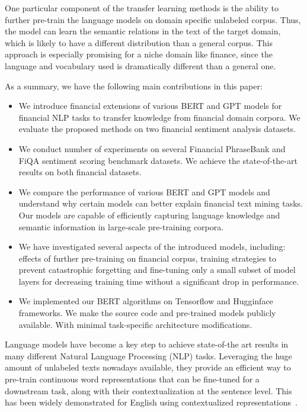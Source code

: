 \documentclass[11pt]{article}
\begin{document}
One particular component of the transfer learning methods is the
ability to further pre-train the language models on domain specific
unlabeled corpus. Thus, the model can learn the semantic relations
in the text of the target domain, which is likely to have a different
distribution than a general corpus. This approach is especially
promising for a niche domain like finance, since the language and
vocabulary used is dramatically different than a general one.

As a summary, we have the following main contributions in this paper:

\begin{itemize}
\item We introduce financial extensions of various BERT and GPT models
  for financial NLP tasks to transfer knowledge from financial domain
  corpora. We evaluate the proposed methods on two
   financial sentiment analysis datasets.
\item We conduct number of experiments on several Financial PhraseBank and FiQA sentiment scoring
  benchmark datasets. We achieve the state-of-the-art results on both financial datasets.
\item We compare the performance of various BERT and GPT models and
  understand why certain models can better explain financial text
  mining tasks. Our models are capable of efficiently capturing language knowledge and semantic
information in large-scale pre-training corpora.
\item We have investigated several aspects of the introduced models, including: effects of further pre-training on financial
corpus, training strategies to prevent catastrophic forgetting and fine-tuning only a small subset of model layers
for decreasing training time without a significant drop in performance.
  \item We implemented our BERT algorithms on Tensorflow and Hugginface
  frameworks. We make the source code and pre-trained models publicly
  available. With minimal task-specific architecture modifications.
\end{itemize}


Language models have become a key step to achieve state-of-the art results in many different Natural Language Processing (NLP)
tasks. Leveraging the huge amount of unlabeled texts nowadays available, they provide an efficient way to pre-train continuous word
representations that can be fine-tuned for a downstream task, along with their contextualization at the sentence level. This has been
widely demonstrated for English using contextualized representations~\cite{dai2015, peters2018, howard2018, radford2018, devlin2019, yang2019}.
\end{document}
